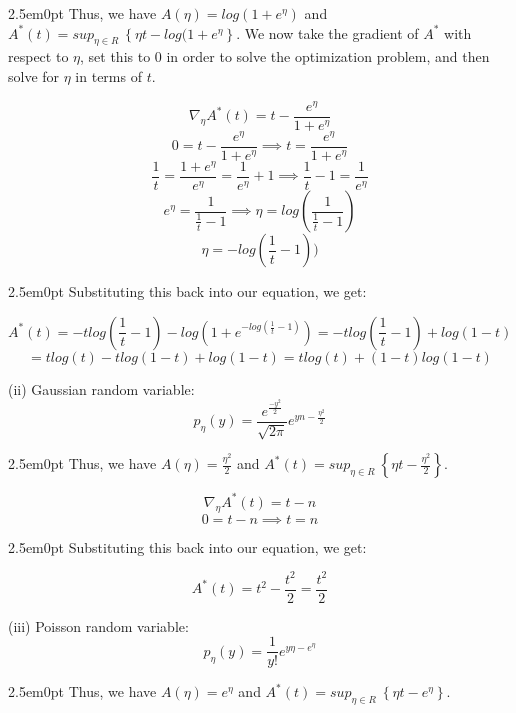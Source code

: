 \documentclass[11pt]{article}
\newenvironment{problem}[2][Problem]{\begin{trivlist}
\item[\hskip \labelsep {\bfseries #1}\hskip \labelsep {\bfseries #2.}]}{\end{trivlist}}
\begin{document}
\begin{problem}{2.2}
\begin{adjustwidth}{2.5em}{0pt}
Thus, we have $A(\eta) = log(1+e^{\eta})$ and $A^{*}(t) = sup_{\eta\in R}~ \left\{\eta t - log(1+e^{\eta}\right\}$. We now take the gradient of $A^{*}$ with respect to $\eta$, set this to 0 in order to solve the optimization problem, and then solve for $\eta$ in terms of $t$.
\end{adjustwidth}

\[\nabla_{\eta} A^{*}(t) = t - \frac{e^{\eta}}{1+e^{\eta}} \]
\[0  = t - \frac{e^{\eta}}{1+e^{\eta}} \implies t = \frac{e^{\eta}}{1+e^{\eta}} \]
\[ \frac{1}{t} = \frac{1+e^{\eta}}{e^{\eta}} = \frac{1}{e^{\eta}} + 1 \implies \frac{1}{t} - 1 = \frac{1}{e^{\eta}}\]
\[e^{\eta} = \frac{1}{\frac{1}{t} - 1} \implies \eta = log(\frac{1}{\frac{1}{t} - 1})\]
\[\eta = -log(\frac{1}{t} - 1))\]

\begin{adjustwidth}{2.5em}{0pt}
Substituting this back into our equation, we get:
\end{adjustwidth}

\[A^{*}(t) = -tlog(\frac{1}{t}-1) - log(1+e^{-log(\frac{1}{t}-1)}) = -tlog(\frac{1}{t}-1) + log(1-t)\]
\[= tlog(t) - tlog(1-t) + log(1-t) = tlog(t) + (1-t)log(1-t)\]

(ii) Gaussian random variable:
\\
\[p_{\eta}(y) = \frac{e^{\frac{-y^{2}}{2}}}{\sqrt{2\pi}}e^{yn - \frac{\eta^2}{2}}\]

\begin{adjustwidth}{2.5em}{0pt}
Thus, we have $A(\eta) = \frac{\eta^2}{2}$ and $A^{*}(t) = sup_{\eta\in R}~ \left\{\eta t - \frac{\eta^2}{2}\right\}$. 
\end{adjustwidth}

\[\nabla_{\eta} A^{*}(t) = t - n \]
\[0 = t - n \implies t = n \]

\begin{adjustwidth}{2.5em}{0pt}
Substituting this back into our equation, we get:
\end{adjustwidth}
\[A^{*}(t) = t^2 - \frac{t^2}{2} = \frac{t^2}{2}\]

(iii) Poisson random variable: 
\\
\[p_{\eta}(y) = \frac{1}{y!}e^{y\eta - e^{\eta}} \]

\begin{adjustwidth}{2.5em}{0pt}
Thus, we have $A(\eta) = e^{\eta}$ and $A^{*}(t) = sup_{\eta\in R}~ \left\{\eta t - e^{\eta}\right\}$. 
\end{adjustwidth}


\end{problem}
\end{document}
